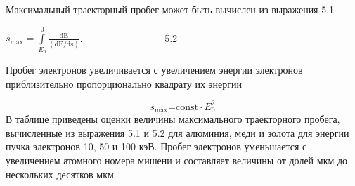 \documentclass[a4paper,14pt, openany, twoside, draft]{extbook} %
\begin{document}
Максимальный траекторный пробег может быть вычислен из выражения 5.1

 $s_{\text{max}}=\overset 0{\underset{E_0}{\int }}\frac{{\text{dE}}}{({\text{dE}}/{\text{ds}})}$. \ \ \ \ \ \ \ \ \ \ \ \ \ \ \ \ 5.2

Пробег электронов увеличивается с увеличением энергии электронов приблизительно пропорционально квадрату их энергии

\begin{equation*}
s_{\text{max}}{\text{=const}}\cdot E_0^2
\end{equation*}
В таблице приведены оценки величины максимального траекторного пробега, вычисленные из выражения 5.1 и 5.2 для алюминия, меди и золота для энергии пучка электронов 10, 50 и 100 кэВ. Пробег электронов уменьшается с увеличением атомного номера мишени и составляет величины от долей мкм до нескольких десятков мкм.
\end{document}

